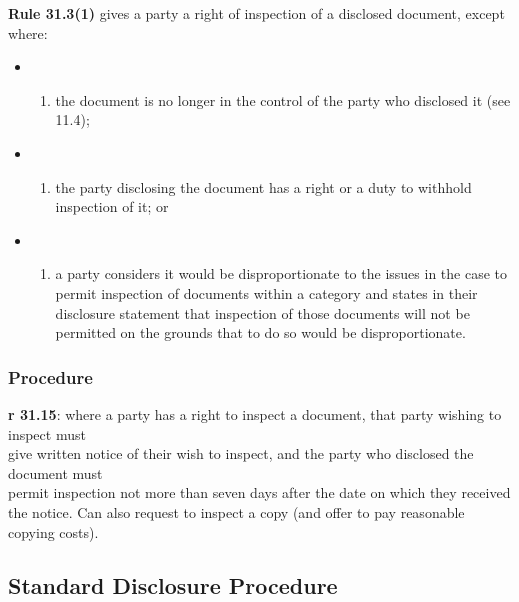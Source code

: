 \documentclass[
]{article}
\providecommand{\tightlist}{%
  \setlength{\itemsep}{0pt}\setlength{\parskip}{0pt}}
\begin{document}
\textbf{Rule 31.3(1)} gives a party a right of inspection of a disclosed
document, except where:

\begin{itemize}
\item
  \begin{enumerate}
  \def\labelenumi{(\alph{enumi})}
  \tightlist
  \item
    the document is no longer in the control of the party who disclosed
    it (see 11.4);
  \end{enumerate}
\item
  \begin{enumerate}
  \def\labelenumi{(\alph{enumi})}
  \setcounter{enumi}{1}
  \tightlist
  \item
    the party disclosing the document has a right or a duty to withhold
    inspection of it; or
  \end{enumerate}
\item
  \begin{enumerate}
  \def\labelenumi{(\alph{enumi})}
  \setcounter{enumi}{2}
  \tightlist
  \item
    a party considers it would be disproportionate to the issues in the
    case to permit inspection of documents within a category and states
    in their disclosure statement that inspection of those documents
    will not be permitted on the grounds that to do so would be
    disproportionate.
  \end{enumerate}
\end{itemize}

\hypertarget{procedure}{%
\subsubsection{Procedure}\label{procedure}}

\textbf{r 31.15}: where a party has a right to inspect a document, that
party wishing to inspect must\\
give written notice of their wish to inspect, and the party who
disclosed the document must\\
permit inspection not more than seven days after the date on which they
received the notice. Can also request to inspect a copy (and offer to
pay reasonable copying costs).

\hypertarget{standard-disclosure-procedure}{%
\subsection{Standard Disclosure
Procedure}\label{standard-disclosure-procedure}}
\end{document}
